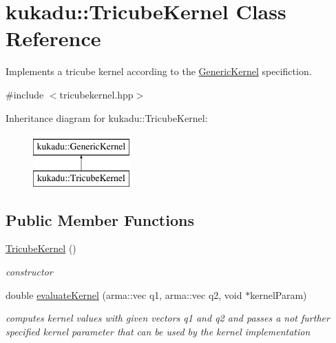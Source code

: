 \hypertarget{classkukadu_1_1TricubeKernel}{\section{kukadu\-:\-:Tricube\-Kernel Class Reference}
\label{classkukadu_1_1TricubeKernel}
}


Implements a tricube kernel according to the \hyperlink{classkukadu_1_1GenericKernel}{Generic\-Kernel} specifiction.  




{\ttfamily \#include $<$tricubekernel.\-hpp$>$}

Inheritance diagram for kukadu\-:\-:Tricube\-Kernel\-:\begin{figure}[H]
\begin{center}
\leavevmode
\includegraphics[height=2.000000cm]{classkukadu_1_1TricubeKernel}
\end{center}
\end{figure}
\subsection*{Public Member Functions}
\begin{DoxyCompactItemize}
\item 
\hypertarget{classkukadu_1_1TricubeKernel_a9b9c6b0452e019ba8f9028e6dce00f64}{\hyperlink{classkukadu_1_1TricubeKernel_a9b9c6b0452e019ba8f9028e6dce00f64}{Tricube\-Kernel} ()}\label{classkukadu_1_1TricubeKernel_a9b9c6b0452e019ba8f9028e6dce00f64}

\begin{DoxyCompactList}\small\item\em constructor \end{DoxyCompactList}\item 
double \hyperlink{classkukadu_1_1TricubeKernel_a2c4053e0212bdfae0652c8bde2ae70df}{evaluate\-Kernel} (arma\-::vec q1, arma\-::vec q2, void $\ast$kernel\-Param)
\begin{DoxyCompactList}\small\item\em computes kernel values with given vectors q1 and q2 and passes a not further specified kernel parameter that can be used by the kernel implementation \end{DoxyCompactList}\end{DoxyCompactItemize}


